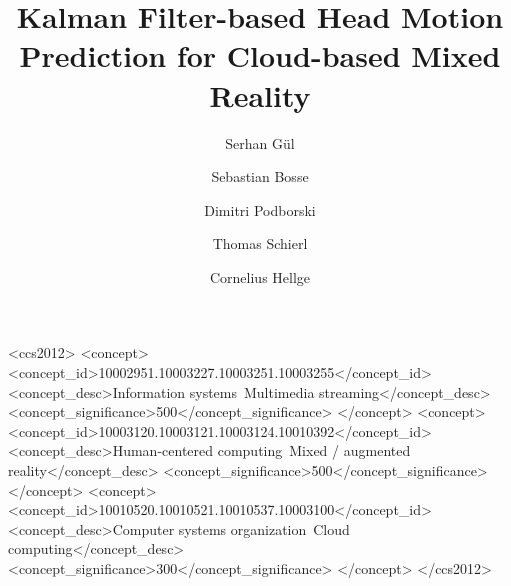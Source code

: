 \documentclass[sigconf]{acmart}			%
\begin{document}
\title{Kalman Filter-based Head Motion Prediction for Cloud-based Mixed Reality}

\author{Serhan G{\"u}l}

\author{Sebastian Bosse}

\author{Dimitri Podborski}

\author{Thomas Schierl}

\author{Cornelius Hellge}

\renewcommand{\shortauthors}{G{\"u}l and Bosse, et al.}

\begin{CCSXML}
	<ccs2012>
	<concept>
	<concept_id>10002951.10003227.10003251.10003255</concept_id>
	<concept_desc>Information systems~Multimedia streaming</concept_desc>
	<concept_significance>500</concept_significance>
	</concept>
	<concept>
	<concept_id>10003120.10003121.10003124.10010392</concept_id>
	<concept_desc>Human-centered computing~Mixed / augmented reality</concept_desc>
	<concept_significance>500</concept_significance>
	</concept>
	<concept>
	<concept_id>10010520.10010521.10010537.10003100</concept_id>
	<concept_desc>Computer systems organization~Cloud computing</concept_desc>
	<concept_significance>300</concept_significance>
	</concept>
	</ccs2012>
\end{CCSXML}

\end{document}

